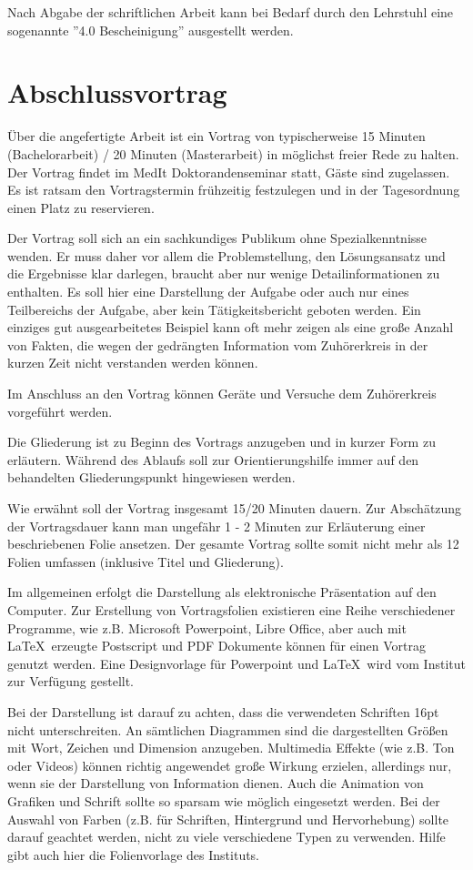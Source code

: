 Nach Abgabe der schriftlichen Arbeit kann bei Bedarf durch den Lehrstuhl eine sogenannte ''4.0 Bescheinigung'' ausgestellt werden.

\section{Abschlussvortrag}

Über die angefertigte Arbeit ist ein Vortrag von typischerweise 15 Minuten (Bachelorarbeit) / 20 Minuten (Masterarbeit) in möglichst freier Rede
zu halten. 
Der Vortrag findet im MedIt Doktorandenseminar statt, Gäste sind zugelassen. Es ist ratsam den Vortragstermin frühzeitig festzulegen und in der Tagesordnung einen Platz zu reservieren. 


Der Vortrag soll sich an ein sachkundiges Publikum ohne Spezialkenntnisse wenden. Er
muss daher vor allem die Problemstellung, den Lösungsansatz und die Ergebnisse klar darlegen,
braucht aber nur wenige Detailinformationen zu enthalten. Es soll hier eine Darstellung der Aufgabe
oder auch nur eines Teilbereichs der Aufgabe, aber kein Tätigkeitsbericht geboten werden. Ein
einziges gut ausgearbeitetes Beispiel kann oft mehr zeigen als eine große Anzahl von Fakten, die
wegen der gedrängten Information vom Zuhörerkreis in der kurzen Zeit nicht verstanden werden
können.

Im Anschluss an den Vortrag können Geräte und Versuche dem Zuhörerkreis vorgeführt werden.

Die Gliederung ist zu Beginn des Vortrags anzugeben und in kurzer Form zu erläutern. Während des
Ablaufs soll zur Orientierungshilfe immer auf den behandelten Gliederungspunkt hingewiesen werden.

Wie erwähnt soll der Vortrag insgesamt 15/20 Minuten dauern. Zur Abschätzung der Vortragsdauer kann
man ungefähr 1 - 2 Minuten zur Erläuterung einer beschriebenen Folie ansetzen. Der gesamte Vortrag
sollte somit nicht mehr als 12 Folien umfassen (inklusive Titel und Gliederung).

Im allgemeinen erfolgt die Darstellung als elektronische Präsentation auf den Computer. Zur Erstellung von Vortragsfolien existieren eine Reihe verschiedener Programme, wie z.B. Microsoft
Powerpoint, Libre Office, aber auch mit \LaTeX\  erzeugte Postscript und PDF Dokumente können für
einen Vortrag genutzt werden. Eine Designvorlage für Powerpoint und \LaTeX\  wird vom Institut zur Verfügung gestellt.

Bei der Darstellung ist darauf zu achten, dass die verwendeten Schriften 16pt nicht unterschreiten.
An sämtlichen Diagrammen sind die dargestellten Größen mit Wort, Zeichen und Dimension anzugeben.
Multimedia Effekte (wie z.B. Ton oder Videos) können richtig angewendet große Wirkung erzielen,
allerdings nur, wenn sie der Darstellung von Information dienen. Auch die Animation von Grafiken
und Schrift sollte so sparsam wie möglich eingesetzt werden. Bei der Auswahl von Farben (z.B. für
Schriften, Hintergrund und Hervorhebung) sollte darauf geachtet werden, nicht zu viele verschiedene
Typen zu verwenden. Hilfe gibt auch hier die Folienvorlage des Instituts.


